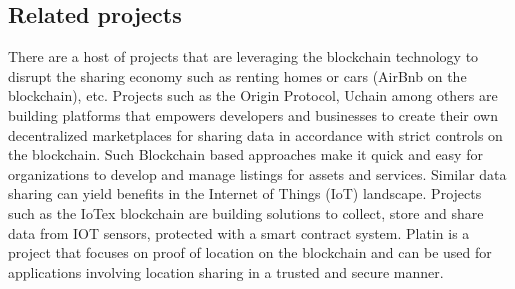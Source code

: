 %
%
%

\subsection{Related projects}

There are a host of projects that are leveraging the blockchain technology to disrupt the
sharing economy such as renting homes or cars (AirBnb on the blockchain), etc. Projects such as the Origin Protocol,
Uchain among others are building platforms that empowers developers and businesses to create their own decentralized
marketplaces for sharing data in accordance with strict controls on the blockchain.  Such Blockchain based approaches
make it quick and easy for organizations to develop and manage listings for assets and services. Similar data sharing
can yield benefits in the Internet of Things (IoT) landscape. Projects such as the IoTex blockchain are building
solutions to collect, store and share data from IOT sensors, protected with a smart contract system.
Platin \cite{platin} is a project that focuses on proof of location on the blockchain and can be used for applications
involving location sharing in a trusted and secure manner.

